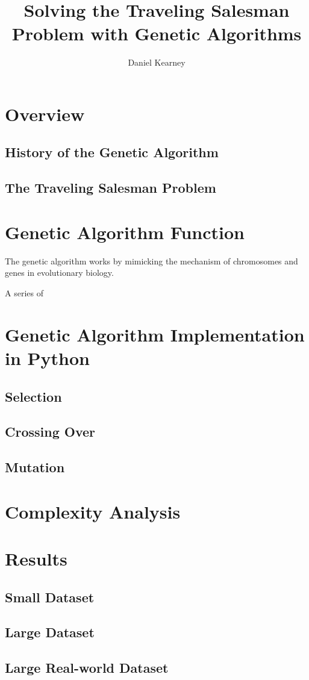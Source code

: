 \documentclass[UTF8]{report}
\begin{document}
\title{%
  Solving the Traveling Salesman Problem with Genetic Algorithms 
}

\author{Daniel Kearney}

\maketitle

\tableofcontents
\pagebreak

\section{Overview}

\subsection{History of the Genetic Algorithm}

\subsection{The Traveling Salesman Problem}

\section{Genetic Algorithm Function}

The genetic algorithm works by mimicking the mechanism of chromosomes and genes in evolutionary biology.

A series of 

\section{Genetic Algorithm Implementation in Python}

\subsection{Selection}


\subsection{Crossing Over}

\subsection{Mutation}

\section{Complexity Analysis}

\section{Results}

\subsection{Small Dataset}

\subsection{Large Dataset}

\subsection{Large Real-world Dataset}
\end{document}
